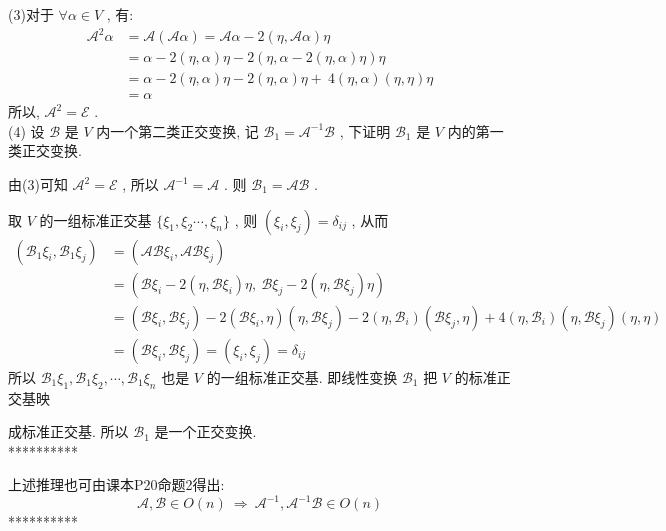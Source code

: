 \documentclass[11pt,a4paper,openany,oneside]{book}
\begin{document}
(3)对于 $ \forall \alpha \in V $ , 有:
\begin{align*}
\mathcal{A}^2\alpha &= \mathcal{A}(\mathcal{A}\alpha) = \mathcal{A}\alpha - 2(\eta, \mathcal{A}\alpha)\eta \\
&= \alpha - 2(\eta, \alpha)\eta - 2(\eta, \alpha-2(\eta,\alpha)\eta)\eta \\
&= \alpha - 2(\eta, \alpha)\eta - 2(\eta, \alpha)\eta +\ 4(\eta, \alpha)(\eta, \eta)\eta \\ 
&= \alpha
\end{align*}
所以,  $ \mathcal{A}^2 = \mathcal{E} $ . \\

(4) 设 $ \mathcal{B} $ 是 $ V $ 内一个第二类正交变换, 记 $ \mathcal{B}_1 = \mathcal{A}^{-1}\mathcal{B} $ , 下证明 $ \mathcal{B}_1 $ 是 $ V $ 内的第一类正交变换.

\hspace{1em} 由(3)可知 $ \mathcal{A}^2 = \mathcal{E} $ , 所以 $ \mathcal{A}^{-1}=\mathcal{A} $ . 则 $ \mathcal{B}_1 = \mathcal{A}\mathcal{B} $ . 

\hspace{1em} 取 $ V $ 的一组标准正交基 $ \{\xi_1, \xi_2 \cdots, \xi_n \} $ , 则 $ (\xi_i, \xi_j) = \delta_{ij} $ , 从而
\begin{align*}
(\mathcal{B}_1\xi_i, \mathcal{B}_1\xi_j) &= (\mathcal{A}\mathcal{B}\xi_i, \mathcal{A}\mathcal{B}\xi_j) \\
&=\left(\mathcal{B}\xi_i - 2(\eta, \mathcal{B}\xi_i)\eta,\ \mathcal{B}\xi_j - 2(\eta, \mathcal{B}\xi_j)\eta\right)  \\
&= (\mathcal{B}\xi_i, \mathcal{B}\xi_j) -2(\mathcal{B}\xi_i, \eta)(\eta, \mathcal{B}\xi_j) -2(\eta, \mathcal{B}_i)(\mathcal{B}\xi_j, \eta) + 4(\eta,\mathcal{B}_i)(\eta, \mathcal{B}\xi_j)(\eta, \eta) \\
&= (\mathcal{B}\xi_i, \mathcal{B}\xi_j) = (\xi_i, \xi_j) = \delta_{ij}  
\end{align*}
\hspace{1em} 所以 $ \mathcal{B}_1\xi_1, \mathcal{B}_1\xi_2, \cdots, \mathcal{B}_1\xi_n $ 也是 $ V $ 的一组标准正交基. 即线性变换 $ \mathcal{B}_1 $ 把 $ V $ 的标准正交基映

\hspace{1em} 成标准正交基. 所以 $ \mathcal{B}_1 $ 是一个正交变换. \\

********** 

上述推理也可由课本P20命题2得出:
 $$ \mathcal{A}, \mathcal{B} \in O(n) \ \Rightarrow \ \mathcal{A}^{-1}, \mathcal{A}^{-1}\mathcal{B} \in O(n) $$ 
**********  \\ 
\end{document}
